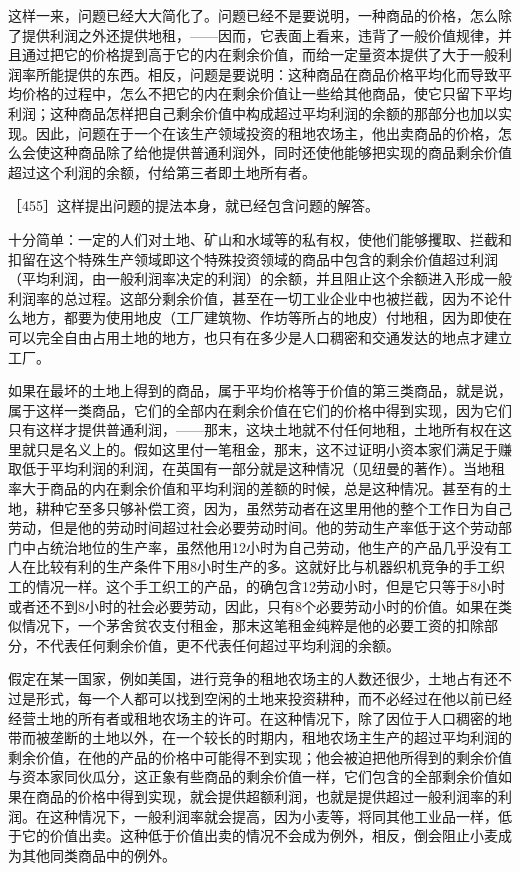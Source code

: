 这样一来，问题已经大大简化了。问题已经不是要说明，一种商品的价格，怎么除了提供利润之外还提供地租，——因而，它表面上看来，违背了一般价值规律，并且通过把它的价格提到高于它的内在剩余价值，而给一定量资本提供了大于一般利润率所能提供的东西。相反，问题是要说明：这种商品在商品价格平均化而导致平均价格的过程中，怎么不把它的内在剩余价值让一些给其他商品，使它只留下平均利润；这种商品怎样把自己剩余价值中构成超过平均利润的余额的那部分也加以实现。因此，问题在于一个在该生产领域投资的租地农场主，他出卖商品的价格，怎么会使这种商品除了给他提供普通利润外，同时还使他能够把实现的商品剩余价值超过这个利润的余额，付给第三者即土地所有者。

［455］这样提出问题的提法本身，就已经包含问题的解答。


十分简单：一定的人们对土地、矿山和水域等的私有权，使他们能够攫取、拦截和扣留在这个特殊生产领域即这个特殊投资领域的商品中包含的剩余价值超过利润（平均利润，由一般利润率决定的利润）的余额，并且阻止这个余额进入形成一般利润率的总过程。这部分剩余价值，甚至在一切工业企业中也被拦截，因为不论什么地方，都要为使用地皮（工厂建筑物、作坊等所占的地皮）付地租，因为即使在可以完全自由占用土地的地方，也只有在多少是人口稠密和交通发达的地点才建立工厂。

如果在最坏的土地上得到的商品，属于平均价格等于价值的第三类商品，就是说，属于这样一类商品，它们的全部内在剩余价值在它们的价格中得到实现，因为它们只有这样才提供普通利润，——那末，这块土地就不付任何地租，土地所有权在这里就只是名义上的。假如这里付一笔租金，那末，这不过证明小资本家们满足于赚取低于平均利润的利润，在英国有一部分就是这种情况（见纽曼的著作）。当地租率大于商品的内在剩余价值和平均利润的差额的时候，总是这种情况。甚至有的土地，耕种它至多只够补偿工资，因为，虽然劳动者在这里用他的整个工作日为自己劳动，但是他的劳动时间超过社会必要劳动时间。他的劳动生产率低于这个劳动部门中占统治地位的生产率，虽然他用12小时为自己劳动，他生产的产品几乎没有工人在比较有利的生产条件下用8小时生产的多。这就好比与机器织机竞争的手工织工的情况一样。这个手工织工的产品，的确包含12劳动小时，但是它只等于8小时或者还不到8小时的社会必要劳动，因此，只有8个必要劳动小时的价值。如果在类似情况下，一个茅舍贫农支付租金，那末这笔租金纯粹是他的必要工资的扣除部分，不代表任何剩余价值，更不代表任何超过平均利润的余额。

假定在某一国家，例如美国，进行竞争的租地农场主的人数还很少，土地占有还不过是形式，每一个人都可以找到空闲的土地来投资耕种，而不必经过在他以前已经经营土地的所有者或租地农场主的许可。在这种情况下，除了因位于人口稠密的地带而被垄断的土地以外，在一个较长的时期内，租地农场主生产的超过平均利润的剩余价值，在他的产品的价格中可能得不到实现；他会被迫把他所得到的剩余价值与资本家同伙瓜分，这正象有些商品的剩余价值一样，它们包含的全部剩余价值如果在商品的价格中得到实现，就会提供超额利润，也就是提供超过一般利润率的利润。在这种情况下，一般利润率就会提高，因为小麦等，将同其他工业品一样，低于它的价值出卖。这种低于价值出卖的情况不会成为例外，相反，倒会阻止小麦成为其他同类商品中的例外。

